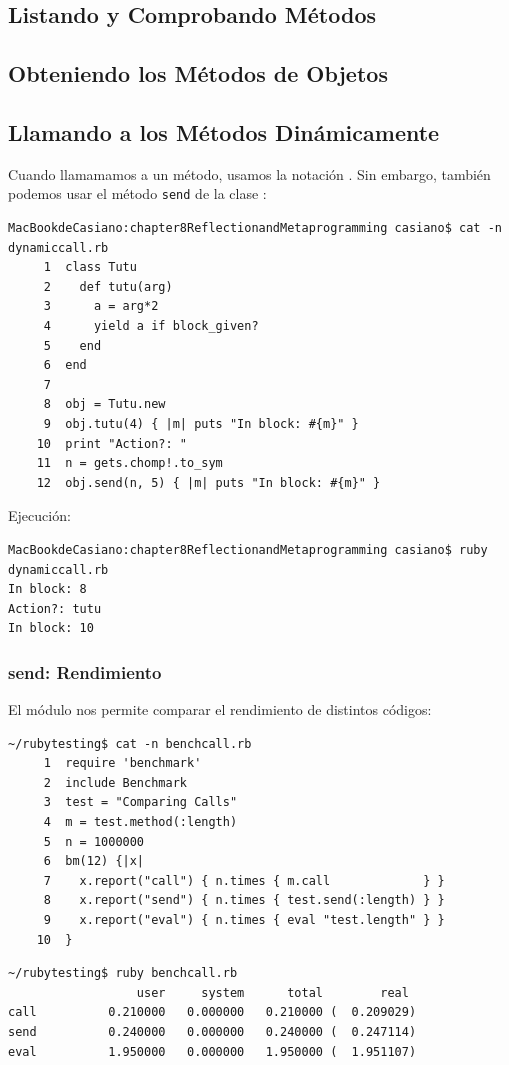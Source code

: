 \subsection{Listando y Comprobando Métodos}

\subsection{Obteniendo los Métodos de Objetos}

\subsection{Llamando a los Métodos Dinámicamente}
Cuando llamamamos a un método, usamos la notación .
Sin embargo, también podemos usar el método \verb|send| de la clase
:
\begin{verbatim}
MacBookdeCasiano:chapter8ReflectionandMetaprogramming casiano$ cat -n dynamiccall.rb 
     1  class Tutu
     2    def tutu(arg)
     3      a = arg*2
     4      yield a if block_given?
     5    end
     6  end
     7  
     8  obj = Tutu.new
     9  obj.tutu(4) { |m| puts "In block: #{m}" }
    10  print "Action?: "
    11  n = gets.chomp!.to_sym 
    12  obj.send(n, 5) { |m| puts "In block: #{m}" }
\end{verbatim}
Ejecución:

\begin{verbatim}
MacBookdeCasiano:chapter8ReflectionandMetaprogramming casiano$ ruby dynamiccall.rb 
In block: 8
Action?: tutu
In block: 10
\end{verbatim}

\subsubsection{send: Rendimiento}
El módulo  nos permite comparar el rendimiento de distintos códigos:
\begin{verbatim}
~/rubytesting$ cat -n benchcall.rb 
     1  require 'benchmark' 
     2  include Benchmark
     3  test = "Comparing Calls" 
     4  m = test.method(:length) 
     5  n = 1000000
     6  bm(12) {|x| 
     7    x.report("call") { n.times { m.call             } } 
     8    x.report("send") { n.times { test.send(:length) } }
     9    x.report("eval") { n.times { eval "test.length" } }
    10  }
\end{verbatim}

\begin{verbatim}
~/rubytesting$ ruby benchcall.rb 
                  user     system      total        real
call          0.210000   0.000000   0.210000 (  0.209029)
send          0.240000   0.000000   0.240000 (  0.247114)
eval          1.950000   0.000000   1.950000 (  1.951107)
\end{verbatim}

